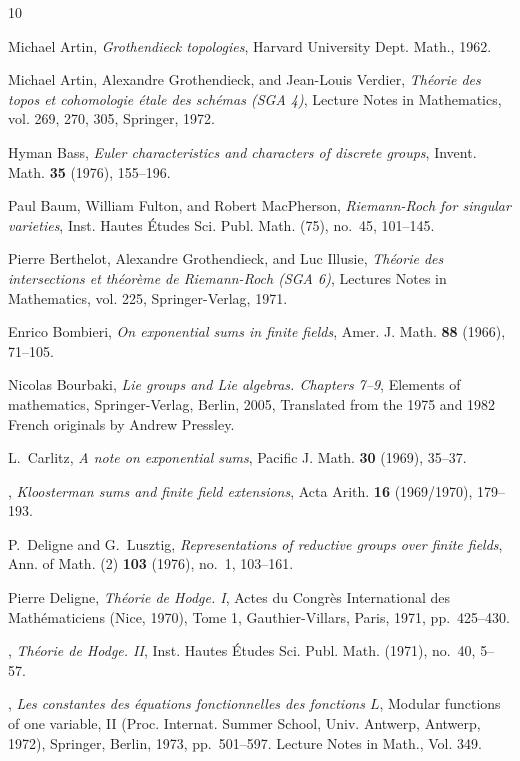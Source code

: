 \documentclass[12pt,oneside,english]{smfbook}
\newcounter{char}
\begin{document}
\begin{thebibliography}{10}

 Michael Artin, \emph{Grothendieck topologies}, Harvard University Dept. Math., 1962.

 Michael Artin, Alexandre Grothendieck, and Jean-Louis Verdier, \emph{Th\'eorie des topos et cohomologie \'etale des sch\'emas ({SGA 4})}, Lecture Notes in Mathematics, vol. 269, 270, 305, Springer, 1972.

 Hyman Bass, \emph{Euler characteristics and characters of discrete groups}, Invent. Math. \textbf{35} (1976), 155--196. 

 Paul Baum, William Fulton, and Robert MacPherson, \emph{Riemann-{R}och for singular varieties}, Inst. Hautes \'Etudes Sci. Publ. Math. (75), no.~45, 101--145.

 Pierre Berthelot, Alexandre Grothendieck, and Luc Illusie, \emph{Th\'eorie des intersections et th\'eor\`eme de {R}iemann-{R}och ({SGA} 6)}, Lectures Notes in Mathematics, vol. 225, Springer-Verlag, 1971.

 Enrico Bombieri, \emph{On exponential sums in finite fields}, Amer. J. Math. \textbf{88} (1966), 71--105.

 Nicolas Bourbaki, \emph{Lie groups and {L}ie algebras. {C}hapters 7--9}, Elements of mathematics, Springer-Verlag, Berlin, 2005, Translated from the 1975 and 1982 French originals by Andrew Pressley.

 L.~Carlitz, \emph{A note on exponential sums}, Pacific J. Math. \textbf{30} (1969), 35--37.

 \bysame, \emph{Kloosterman sums and finite field extensions}, Acta Arith. \textbf{16} (1969/1970), 179--193.

 P.~Deligne and G.~Lusztig, \emph{Representations of reductive groups over finite fields}, Ann. of Math. (2) \textbf{103} (1976), no.~1, 103--161.

 Pierre Deligne, \emph{Th\'eorie de {H}odge. {I}}, Actes du {C}ongr\`es {I}nternational des {M}ath\'ematiciens ({N}ice, 1970), {T}ome 1, Gauthier-Villars, Paris, 1971, pp.~425--430.

 \bysame, \emph{Th\'eorie de {H}odge. {II}}, Inst. Hautes \'Etudes Sci. Publ. Math. (1971), no.~40, 5--57.

 \bysame, \emph{Les constantes des \'equations fonctionnelles des fonctions {$L$}}, Modular functions of one variable, {II} ({P}roc. {I}nternat. {S}ummer {S}chool, {U}niv. {A}ntwerp, {A}ntwerp, 1972), Springer, Berlin, 1973, pp.~501--597. Lecture Notes in Math., Vol. 349.


\end{thebibliography}
\end{document}
